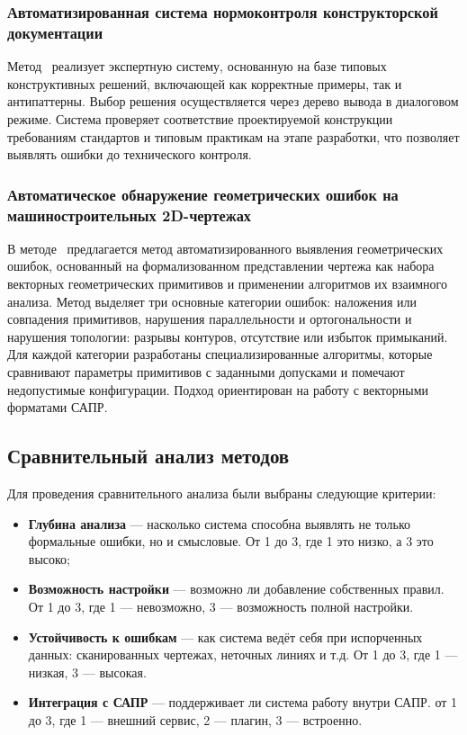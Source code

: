 \subsubsection{Автоматизированная система нормоконтроля конструкторской документации}

Метод~\cite{frantsuzova2017automated} реализует экспертную систему, основанную на базе типовых конструктивных решений,
включающей как корректные примеры, так и антипаттерны.
Выбор решения осуществляется через дерево вывода в диалоговом режиме.
Система проверяет соответствие проектируемой конструкции требованиям стандартов и типовым практикам
на этапе разработки, что позволяет выявлять ошибки до технического контроля.

\subsubsection{Автоматическое обнаружение геометрических ошибок на машиностроительных 2D-чертежах}

В методе~\cite{vasinauto} предлагается метод автоматизированного выявления геометрических ошибок,
основанный на формализованном представлении чертежа как набора векторных геометрических примитивов
и применении алгоритмов их взаимного анализа.
Метод выделяет три основные категории ошибок: наложения или совпадения примитивов,
нарушения параллельности и ортогональности и нарушения топологии: разрывы контуров, отсутствие или избыток примыканий.
Для каждой категории разработаны специализированные алгоритмы, которые сравнивают параметры примитивов
с заданными допусками и помечают недопустимые конфигурации.
Подход ориентирован на работу с векторными форматами САПР.

\subsection{Сравнительный анализ методов}
Для проведения сравнительного анализа были выбраны следующие критерии:
\begin{itemize}
    \item \textbf{Глубина анализа} --- насколько система способна выявлять не только формальные ошибки, но и смысловые. От 1 до 3, где 1 это низко, а 3 это высоко;
    \item \textbf{Возможность настройки} --- возможно ли добавление собственных правил. От 1 до 3, где 1 --- невозможно, 3 --- возможность полной настройки.
    \item \textbf{Устойчивость к ошибкам} --- как система ведёт себя при испорченных данных: сканированных чертежах, неточных линиях и т.д. От 1 до 3, где 1 --- низкая, 3 --- высокая.
    \item \textbf{Интеграция с САПР} --- поддерживает ли система работу внутри САПР. от 1 до 3, где 1 --- внешний сервис, 2 --- плагин, 3 --- встроенно.
\end{itemize}

